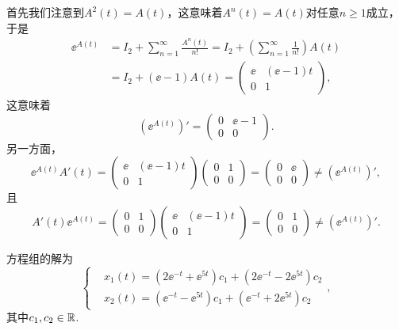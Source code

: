 \begin{solution}
  首先我们注意到$A^2(t)=A(t)$，这意味着$A^n(t)=A(t)$对任意$n\ge1$成立，于是
  \begin{align*}
    \ee^{A(t)} & = I_2 + \sum_{n=1}^\infty \frac{A^n(t)}{n!}  = I_2 + \left( \sum_{n=1}^\infty \frac1{n!} \right) A(t) \\
    & = I_2 + (\ee-1)A(t) = \begin{pmatrix}
      \ee & (\ee-1)t \\
      0 & 1
    \end{pmatrix},
  \end{align*}
  这意味着
  \[
    \left( \ee^{A(t)} \right)' = \begin{pmatrix}
      0 & \ee-1\\
      0 & 0
    \end{pmatrix}.
  \]
  另一方面，
  \[
    \ee^{A(t)}A'(t) = \begin{pmatrix}
      \ee & (\ee-1)t \\
      0 & 1
    \end{pmatrix} \begin{pmatrix}
      0 & 1 \\
      0 & 0
    \end{pmatrix} = \begin{pmatrix}
      0 & \ee \\
      0 & 0
    \end{pmatrix} \ne \left( \ee^{A(t)} \right)' ,
  \]
  且
  \[
    A'(t) \ee^{A(t)} = \begin{pmatrix}
      0 & 1 \\
      0 & 0
    \end{pmatrix}\begin{pmatrix}
      \ee & (\ee-1)t \\
      0 & 1
    \end{pmatrix} = \begin{pmatrix}
      0 & 1 \\
      0 & 0
    \end{pmatrix} \ne  \left( \ee^{A(t)} \right)'.
  \]
\end{solution}

\begin{solution}
  方程组的解为
  \[
    \left\{
      \begin{aligned}
        & x_1(t) = (2\ee^{-t}+\ee^{5t})c_1 + (2\ee^{-t}-2\ee^{5t})c_2 \\
        & x_2(t) = (\ee^{-t}-\ee^{5t})c_1 + (\ee^{-t}+2\ee^{5t})c_2
      \end{aligned}
    \right.,
  \]
  其中$c_1,c_2\in\mathbb R$.
\end{solution}

